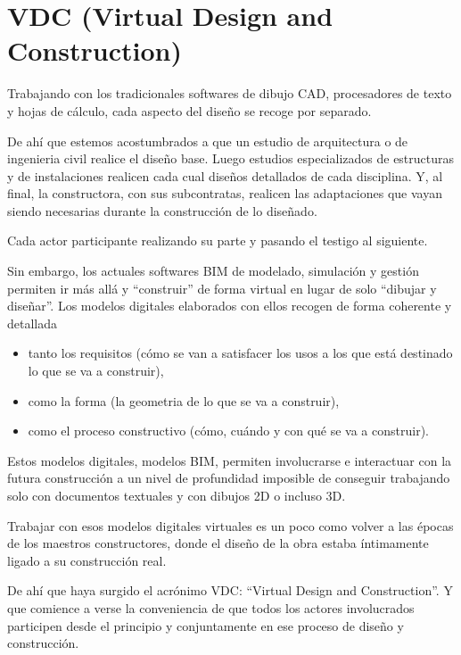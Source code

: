 \documentclass[spanish,12pt,a4paper,final,oneside]{book}
\begin{document}
\section{VDC (Virtual Design and Construction)}
 
Trabajando con los tradicionales softwares de dibujo CAD, procesadores de texto y hojas de cálculo, cada aspecto del diseño se recoge por separado.

De ahí que estemos acostumbrados a que un estudio de arquitectura o de ingenieria civil realice el diseño base. Luego estudios especializados de estructuras y de instalaciones realicen cada cual diseños detallados de cada disciplina. Y, al final, la constructora, con sus subcontratas, realicen las adaptaciones que vayan siendo necesarias durante la construcción de lo diseñado.

Cada actor participante realizando su parte y pasando el testigo al siguiente.

Sin embargo, los actuales softwares BIM de modelado, simulación y gestión permiten ir más allá y ``construir'' de forma virtual en lugar de solo ``dibujar y diseñar''. Los modelos digitales elaborados con ellos recogen de forma coherente y detallada
\begin{itemize}
\item tanto los requisitos (cómo se van a satisfacer los usos a los que está destinado lo que se va a construir), 
\item como la forma (la geometria de lo que se va a construir), 
\item como el proceso constructivo (cómo, cuándo y con qué se va a construir).
\end{itemize}

Estos modelos digitales, modelos BIM, permiten involucrarse e interactuar con la futura construcción a un nivel de profundidad imposible de conseguir trabajando solo con documentos textuales y con dibujos 2D o incluso 3D.

Trabajar con esos modelos digitales virtuales es un poco como volver a las épocas de los maestros constructores, donde el diseño de la obra estaba íntimamente ligado a su construcción real.

De ahí que haya surgido el acrónimo VDC: ``Virtual Design and Construction''. Y que comience a verse la conveniencia de que todos los actores involucrados participen desde el principio y conjuntamente en ese proceso de diseño y construcción. 
\end{document}
